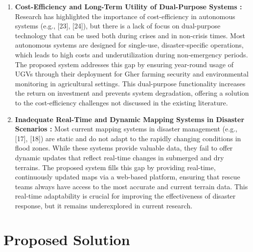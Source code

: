 \documentclass[conference]{IEEEtran}
\begin{document}
\begin{enumerate}
	
	\item \textbf{Cost-Efficiency and Long-Term Utility of Dual-Purpose Systems : }
	Research has highlighted the importance of cost-efficiency in autonomous systems (e.g., [23], [24]), but there is a lack of focus on dual-purpose technology that can be used both during crises and in non-crisis times. Most autonomous systems are designed for single-use, disaster-specific operations, which leads to high costs and underutilization during non-emergency periods. The proposed system addresses this gap by ensuring year-round usage of UGVs through their deployment for Gher farming security and environmental monitoring in agricultural settings. This dual-purpose functionality increases the return on investment and prevents system degradation, offering a solution to the cost-efficiency challenges not discussed in the existing literature.
	
	\item \textbf{Inadequate Real-Time and Dynamic Mapping Systems in Disaster Scenarios : }
Most current mapping systems in disaster management (e.g., [17], [18]) are static and do not adapt to the rapidly changing conditions in flood zones. While these systems provide valuable data, they fail to offer dynamic updates that reflect real-time changes in submerged and dry terrains. The proposed system fills this gap by providing real-time, continuously updated maps via a web-based platform, ensuring that rescue teams always have access to the most accurate and current terrain data. This real-time adaptability is crucial for improving the effectiveness of disaster response, but it remains underexplored in current research.	
		
\end{enumerate}	


\section{\textbf{Proposed Solution}}
\end{document}
